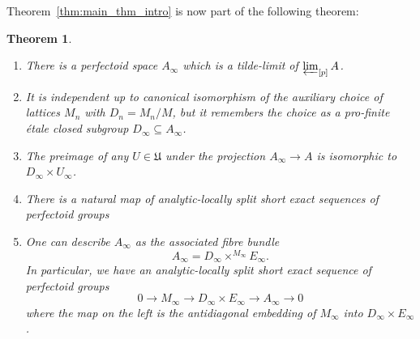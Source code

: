 \documentclass[10pt,oneside]{amsart}
\newtheorem{theorem}{Theorem}[section]
\theoremstyle{definition}
\begin{document}
Theorem~\ref{thm:main_thm_intro} is now part of the following theorem:	
	\begin{theorem}\label{tilde-limit of tilde-limits of partial towers is tilde-limit of whole tower}
		\begin{enumerate}
		\item There is a perfectoid space  $A_\infty$ which is a tilde-limit of $\varprojlim_{[p]}A$.
		\item It is independent up to canonical isomorphism of the auxiliary choice of lattices $M_n$ with $D_n=M_n/M$, but it remembers the choice as a pro-finite \'etale closed subgroup $D_\infty \subseteq A_\infty$. 
		\item The preimage of any $U\in \mathfrak U$ under the projection $A_\infty \rightarrow A$ is isomorphic to $D_\infty \times U_\infty$. 
		
		\item 	There is a natural map of analytic-locally split short exact sequences of perfectoid groups		
		\begin{center}
		\end{center}
		\item One can describe $A_\infty$ as the associated fibre bundle
		\[A_\infty = D_\infty\times^{M_\infty}E_\infty.\]
		In particular, we have an analytic-locally split short exact sequence of perfectoid groups
		\[0\rightarrow M_\infty\rightarrow D_\infty \times E_\infty \rightarrow A_\infty\rightarrow 0\]
		where the map on the left is the antidiagonal embedding of $M_\infty$ into $D_\infty\times E_\infty$.
		\end{enumerate}
	\end{theorem}
\end{document}
